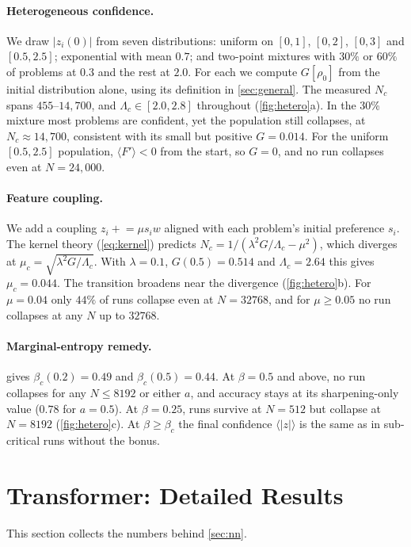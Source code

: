 \paragraph{Heterogeneous confidence.}
We draw $|z_i(0)|$ from seven distributions: uniform on $[0,1]$, $[0,2]$, $[0,3]$ and $[0.5,2.5]$; exponential with mean $0.7$; and two-point mixtures with $30\%$ or $60\%$ of problems at $0.3$ and the rest at $2.0$.
For each we compute $G[\rho_0]$ from the initial distribution alone, using its definition in \cref{sec:general}.
The measured $N_c$ spans $455$--$14{,}700$, and $\Lambda_c\in[2.0,2.8]$ throughout (\cref{fig:hetero}a).
In the 30\% mixture most problems are confident, yet the population still collapses, at $N_c\approx14{,}700$, consistent with its small but positive $G=0.014$.
For the uniform $[0.5,2.5]$ population, $\langle F'\rangle<0$ from the start, so $G=0$, and no run collapses even at $N=24{,}000$.

\paragraph{Feature coupling.}
We add a coupling $z_i\mathrel{+}=\mu s_iw$ aligned with each problem's initial preference $s_i$. The kernel theory (\cref{eq:kernel}) predicts $N_c=1/(\lambda^2G/\Lambda_c-\mu^2)$, which diverges at $\mu_c=\sqrt{\lambda^2G/\Lambda_c}$. With $\lambda=0.1$, $G(0.5)=0.514$ and $\Lambda_c=2.64$ this gives $\mu_c=0.044$.
The transition broadens near the divergence (\cref{fig:hetero}b). For $\mu=0.04$ only $44\%$ of runs collapse even at $N=32768$, and for $\mu\ge0.05$ no run collapses at any $N$ up to $32768$.

\paragraph{Marginal-entropy remedy.}
 gives $\beta_c(0.2)=0.49$ and $\beta_c(0.5)=0.44$.
At $\beta=0.5$ and above, no run collapses for any $N\le8192$ or either $a$, and accuracy stays at its sharpening-only value ($0.78$ for $a=0.5$). At $\beta=0.25$, runs survive at $N=512$ but collapse at $N=8192$ (\cref{fig:hetero}c).
At $\beta\ge\beta_c$ the final confidence $\langle|z|\rangle$ is the same as in sub-critical runs without the bonus.



\section{Transformer: Detailed Results}
\label{app:nndetails}
This section collects the numbers behind \cref{sec:nn}.

